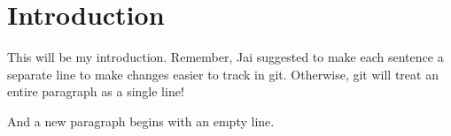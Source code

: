 \section{Introduction}

This will be my introduction.
Remember, Jai suggested to make each sentence a separate line to make changes easier to track in git.
Otherwise, git will treat an entire paragraph as a single line!

And a new paragraph begins with an empty line.